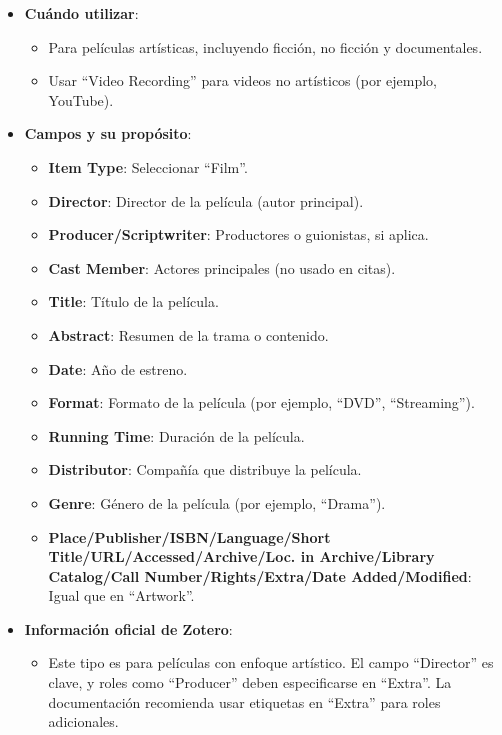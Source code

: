 \documentclass[
  jou,
  floatsintext,
  longtable,
  a4paper,
  nolmodern,
  notxfonts,
  notimes,
  colorlinks=true,linkcolor=blue,citecolor=blue,urlcolor=blue]{apa7}
\providecommand{\tightlist}{%
  \setlength{\itemsep}{0pt}\setlength{\parskip}{0pt}}
\begin{document}
\begin{itemize}
\tightlist
\item
  \textbf{Cuándo utilizar}:

  \begin{itemize}
  \tightlist
  \item
    Para películas artísticas, incluyendo ficción, no ficción y
    documentales.
  \item
    Usar ``Video Recording'' para videos no artísticos (por ejemplo,
    YouTube).
  \end{itemize}
\item
  \textbf{Campos y su propósito}:

  \begin{itemize}
  \tightlist
  \item
    \textbf{Item Type}: Seleccionar ``Film''.
  \item
    \textbf{Director}: Director de la película (autor principal).
  \item
    \textbf{Producer/Scriptwriter}: Productores o guionistas, si aplica.
  \item
    \textbf{Cast Member}: Actores principales (no usado en citas).
  \item
    \textbf{Title}: Título de la película.
  \item
    \textbf{Abstract}: Resumen de la trama o contenido.
  \item
    \textbf{Date}: Año de estreno.
  \item
    \textbf{Format}: Formato de la película (por ejemplo, ``DVD'',
    ``Streaming'').
  \item
    \textbf{Running Time}: Duración de la película.
  \item
    \textbf{Distributor}: Compañía que distribuye la película.
  \item
    \textbf{Genre}: Género de la película (por ejemplo, ``Drama'').
  \item
    \textbf{Place/Publisher/ISBN/Language/Short
    Title/URL/Accessed/Archive/Loc. in Archive/Library Catalog/Call
    Number/Rights/Extra/Date Added/Modified}: Igual que en ``Artwork''.
  \end{itemize}
\item
  \textbf{Información oficial de Zotero}:

  \begin{itemize}
  \tightlist
  \item
    Este tipo es para películas con enfoque artístico. El campo
    ``Director'' es clave, y roles como ``Producer'' deben especificarse
    en ``Extra''. La documentación recomienda usar etiquetas en
    ``Extra'' para roles adicionales.
  \end{itemize}
\end{itemize}
\end{document}
